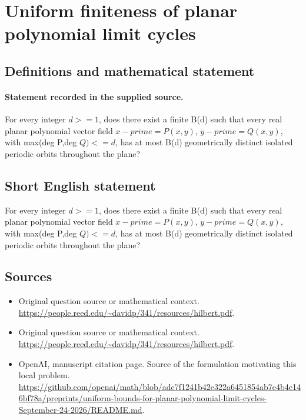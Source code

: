 \documentclass[11pt]{article}
\begin{document}
\section*{Uniform finiteness of planar polynomial limit cycles}\label{statement}
\subsection{Definitions and mathematical statement}
\paragraph{Statement recorded in the supplied source.}
For every integer $d>=1$, does there exist a finite B(d) such that every real planar polynomial vector field $x-prime=P(x,y)$, $y-prime=Q(x,y)$, with max(deg P,deg $Q)<=d$, has at most B(d) geometrically distinct isolated periodic orbits throughout the plane?
\subsection{Short English statement}
For every integer $d>=1$, does there exist a finite B(d) such that every real planar polynomial vector field $x-prime=P(x,y)$, $y-prime=Q(x,y)$, with max(deg P,deg $Q)<=d$, has at most B(d) geometrically distinct isolated periodic orbits throughout the plane?
\subsection{Sources}
\begin{itemize}
\item[S1] Original question source or mathematical context.
\url{https://people.reed.edu/~davidp/341/resources/hilbert.pdf}.
\item[S2] Original question source or mathematical context.
\url{https://people.reed.edu/~davidp/341/resources/hilbert.pdf}.
\item[S3] OpenAI, manuscript citation page. Source of the formulation motivating this local problem.
\url{https://github.com/openai/math/blob/adc7f1241b42e322a6451854ab7e4b4c146bf78a/preprints/uniform-bounds-for-planar-polynomial-limit-cycles-September-24-2026/README.md}.
\end{itemize}
\end{document}
